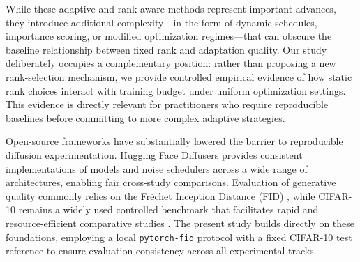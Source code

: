 While these adaptive and rank-aware methods represent important advances, they introduce
additional complexity---in the form of dynamic schedules, importance scoring, or modified
optimization regimes---that can obscure the baseline relationship between fixed rank and
adaptation quality. Our study deliberately occupies a complementary position: rather than
proposing a new rank-selection mechanism, we provide controlled empirical evidence of how
static rank choices interact with training budget under uniform optimization settings. This
evidence is directly relevant for practitioners who require reproducible baselines before
committing to more complex adaptive strategies.

Open-source frameworks have substantially lowered the barrier to reproducible diffusion
experimentation. Hugging Face Diffusers \cite{vonplaten2022diffusers} provides consistent
implementations of models and noise schedulers across a wide range of architectures, enabling
fair cross-study comparisons. Evaluation of generative quality commonly relies on the
Fr\'{e}chet Inception Distance (FID) \cite{heusel2017fid}, while CIFAR-10 remains a widely
used controlled benchmark that facilitates rapid and resource-efficient comparative studies
\cite{krizhevsky2009cifar}. The present study builds directly on these foundations, employing a
local \texttt{pytorch-fid} protocol with a fixed CIFAR-10 test reference to ensure evaluation
consistency across all experimental tracks.
